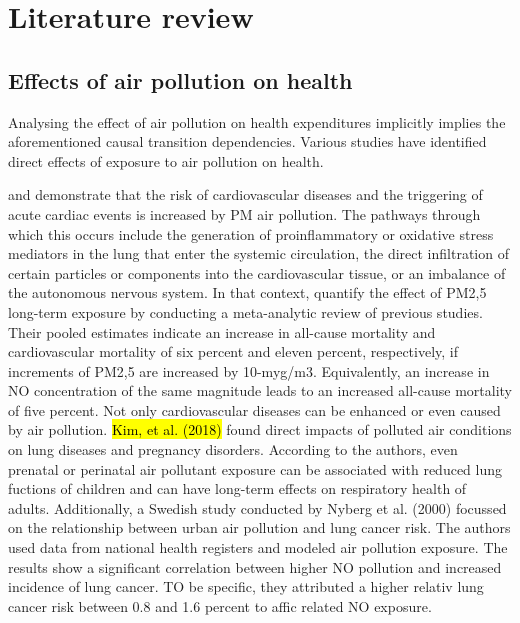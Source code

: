 \documentclass[
]{article}
\begin{document}
	\hypertarget{literature review}{%
		\section{Literature review}\label{Literature review}}
	
	\subsection{Effects of air pollution on health}
	
	Analysing the effect of air pollution on health expenditures implicitly implies the aforementioned causal transition dependencies. Various studies have identified direct effects of exposure to air pollution on health. %
	
	\cite{franklin2015air} and \cite{fiordelisi2017mechanisms} demonstrate that the risk of cardiovascular diseases and the triggering of acute cardiac events is increased by PM air pollution. The pathways through which this occurs include the generation of proinflammatory or oxidative stress mediators in the lung that enter the systemic circulation, the direct infiltration of certain particles or components into the cardiovascular tissue, or an imbalance of the autonomous nervous system. In that context, \cite{hoek2013long} quantify the effect of PM2,5 long-term exposure by conducting a meta-analytic review of previous studies. Their pooled estimates indicate an increase in all-cause mortality and cardiovascular mortality of six percent and eleven percent, respectively, if increments of PM2,5 are increased by 10-myg/m3. Equivalently, an increase in NO concentration of the same magnitude leads to an increased all-cause mortality of five percent. %
	Not only cardiovascular diseases can be enhanced or even caused by air pollution. \hl{Kim, et al. (2018)} %
	 found direct impacts of polluted air conditions on lung diseases and pregnancy disorders. According to the authors, even prenatal or perinatal air pollutant exposure can be associated with reduced lung fuctions of children and can have long-term effects on respiratory health of adults. Additionally, a Swedish study conducted by Nyberg et al. (2000) focussed on the relationship between urban air pollution and lung cancer risk. The authors used data from national health registers and modeled air pollution exposure. The results show a significant correlation between higher NO pollution and increased incidence of lung cancer. TO be specific, they attributed a higher relativ lung cancer risk between 0.8 and 1.6 percent to affic related NO exposure. 
	
\end{document}
